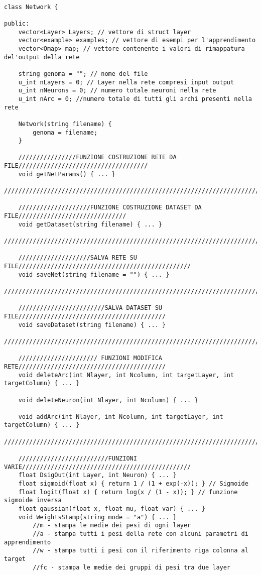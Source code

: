 \documentclass[10pt,a4paper]{article}
\begin{document}
\begin{lstlisting}[style=mycuda, caption=class Network, captionpos=b]

class Network {

public:
	vector<Layer> Layers; // vettore di struct layer
	vector<example> examples; // vettore di esempi per l'apprendimento
	vector<Omap> map; // vettore contenente i valori di rimappatura del'output della rete

	string genoma = ""; // nome del file
	u_int nLayers = 0; // Layer nella rete compresi input output
	u_int nNeurons = 0; // numero totale neuroni nella rete
	u_int nArc = 0; //numero totale di tutti gli archi presenti nella rete

	Network(string filename) {
		genoma = filename;
	}

	////////////////FUNZIONE COSTRUZIONE RETE DA FILE////////////////////////////////////
	void getNetParams() { ... }
	//////////////////////////////////////////////////////////////////////////////////////
	
	////////////////////FUNZIONE COSTRUZIONE DATASET DA FILE//////////////////////////////
	void getDataset(string filename) { ... }
	//////////////////////////////////////////////////////////////////////////////////////
	
	////////////////////SALVA RETE SU FILE////////////////////////////////////////////////
	void saveNet(string filename = "") { ... }
	//////////////////////////////////////////////////////////////////////////////////////
	
	////////////////////////SALVA DATASET SU FILE/////////////////////////////////////////
	void saveDataset(string filename) { ... }
	//////////////////////////////////////////////////////////////////////////////////////
	
	////////////////////// FUNZIONI MODIFICA RETE/////////////////////////////////////////
	void deleteArc(int Nlayer, int Ncolumn, int targetLayer, int targetColumn) { ... }
	
	void deleteNeuron(int Nlayer, int Ncolumn) { ... }
	
	void addArc(int Nlayer, int Ncolumn, int targetLayer, int targetColumn) { ... }
	//////////////////////////////////////////////////////////////////////////////////////
	
	/////////////////////////FUNZIONI VARIE///////////////////////////////////////////////
	float DsigOut(int Layer, int Neuron) { ... }
	float sigmoid(float x) { return 1 / (1 + exp(-x)); } // Sigmoide
	float logit(float x) { return log(x / (1 - x)); } // funzione sigmoide inversa 
	float gaussian(float x, float mu, float var) { ... }
	void WeightsStamp(string mode = "a") { ... }
		//m - stampa le medie dei pesi di ogni layer
		//a - stampa tutti i pesi della rete con alcuni parametri di apprendimento
		//w - stampa tutti i pesi con il riferimento riga colonna al target
		//fc - stampa le medie dei gruppi di pesi tra due layer 	
		

\end{lstlisting}
\end{document}
